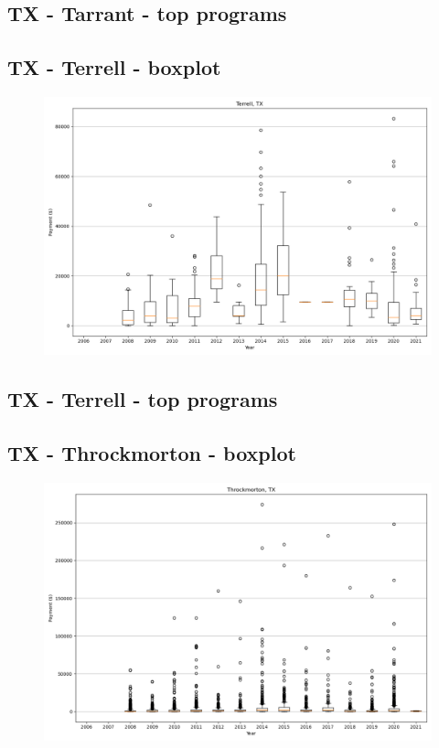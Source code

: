 \subsection*{TX - Tarrant - top programs}

\newpage
\subsection*{TX - Terrell - boxplot}
\begin{figure}[h]
\centering
\includegraphics[width=7in]{../output/boxplots/counties/Terrell-TX_boxplot.png}
\end{figure}


\subsection*{TX - Terrell - top programs}

\newpage
\subsection*{TX - Throckmorton - boxplot}
\begin{figure}[h]
\centering
\includegraphics[width=7in]{../output/boxplots/counties/Throckmorton-TX_boxplot.png}
\end{figure}


